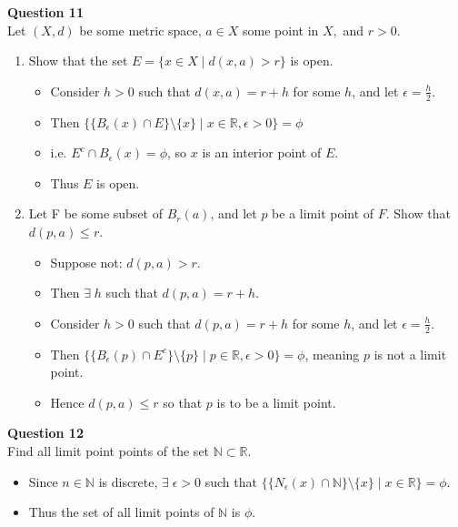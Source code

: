 \documentclass[12pt]{article}
\begin{document}
\vspace{1.5\baselineskip}
\textbf{Question 11}\\
Let $(X,d)$ be some metric space, $a\in X$ some point in $X,$ and $r>0$.
\begin{enumerate}[label=(\roman*)]
    \item Show that the set $E = \{x\in X\;|\;d(x,a) >r\}$ is open.
        \begin{itemize}
            \item Consider $h>0$ such that $d(x,a) = r + h$ for some $h$, and let $\epsilon = \frac{h}{2}$.
            \item Then $\{\{B_\epsilon (x) \cap E\}\setminus\{x\}\;|\; x\in \mathbb{R}, \epsilon >0 \} = \phi$
            \item i.e. $E^c \cap B_\epsilon(x) = \phi$, so $x$ is an interior point of $E$.
            \item Thus $E$ is open.
        \end{itemize}
        
    \item Let F be some subset of $B_r(a)$, and let $p$ be a limit point of $F$. Show that $d(p,a) \le r$.
        \begin{itemize}
            \item Suppose not: $d(p,a) > r$.
            \item Then $\exists\; h$ such that $d(p,a)=r + h$. 
            \item Consider $h>0$ such that $d(p,a) = r + h$ for some $h$, and let $\epsilon = \frac{h}{2}$.
            \item Then $\{\{B_\epsilon (p) \cap E^c\}\setminus\{p\}\;|\; p\in \mathbb{R}, \epsilon >0 \} = \phi$, meaning $p$ is not a limit point.
            \item Hence $d(p,a) \le r$ so that $p$ is to be a limit point.
        \end{itemize}
\end{enumerate}

\vspace{1.5\baselineskip}
\textbf{Question 12}\\
Find all limit point points of the set $\mathbb{N} \subset \mathbb{R}$.
\begin{itemize}
    \item Since $n\in \mathbb{N}$ is discrete, $\exists\; \epsilon >0$ such that $\{\{N_\epsilon (x) \cap \mathbb{N}\}\setminus\{x\}\;|\; x\in \mathbb{R} \} = \phi$.
    \item Thus the set of all limit points of $\mathbb{N}$ is $\phi$.
\end{itemize}
\end{document}

